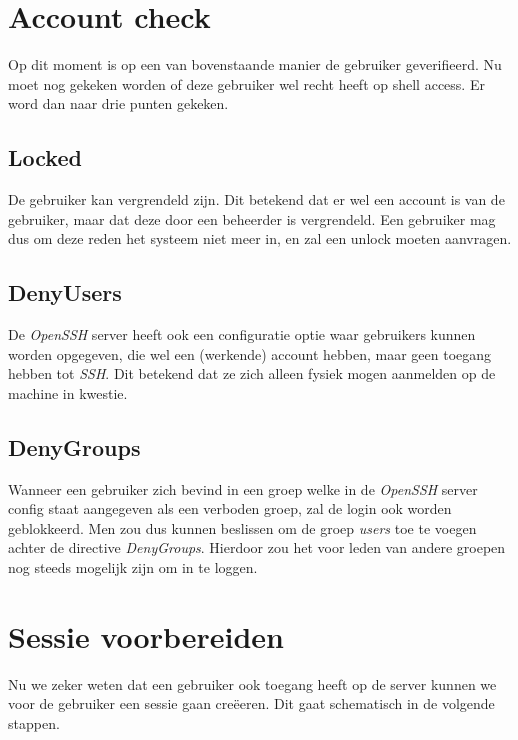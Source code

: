 \section{Account check}
Op dit moment is op een van bovenstaande manier de gebruiker geverifieerd. Nu moet nog gekeken worden of deze gebruiker wel recht heeft op shell access. Er word dan naar drie punten gekeken. 

\subsection{Locked}
De gebruiker kan vergrendeld zijn. Dit betekend dat er wel een account is van de gebruiker, maar dat deze door een beheerder is vergrendeld. Een gebruiker mag dus om deze reden het systeem niet meer in, en zal een unlock moeten aanvragen. 

\subsection{DenyUsers}
De \emph{OpenSSH} server heeft ook een configuratie optie waar gebruikers kunnen worden opgegeven, die wel een (werkende) account hebben, maar geen toegang hebben tot \emph{SSH}. Dit betekend dat ze zich alleen fysiek mogen aanmelden op de machine in kwestie. 

\subsection{DenyGroups}
Wanneer een gebruiker zich bevind in een groep welke in de \emph{OpenSSH} server config  staat aangegeven als een verboden groep, zal de login ook worden geblokkeerd. Men zou dus kunnen beslissen om de groep \emph{users} toe te voegen achter de directive \emph{DenyGroups}. Hierdoor zou het voor leden van andere groepen nog steeds mogelijk zijn om in te loggen. 

\section{Sessie voorbereiden}
Nu we zeker weten dat een gebruiker ook toegang heeft op de server kunnen we voor de gebruiker een sessie gaan cre\"{e}eren. Dit gaat schematisch in de volgende stappen. 

